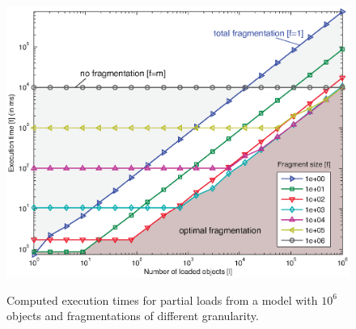 \begin{figure}
\centering
\includegraphics[width=0.65\linewidth]{figures/theoryTimesSmall}
\label{fig:theoryTimesSmall}
\caption{Computed execution times for partial loads from a model with $10^6$ objects and fragmentations of different granularity.}
\end{figure}


